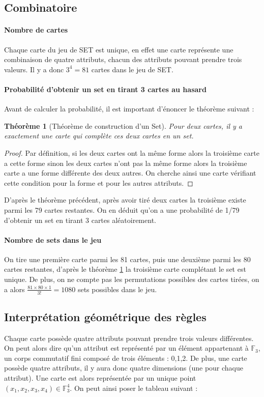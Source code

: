 \documentclass[a4paper,12pt,titlepage]{article}
\theoremstyle{plain}
\newtheorem{thm}{Théorème}
\theoremstyle{definition}
\newcommand{\Ftrois}[1]{\mathbb{F}^#1_3}
\begin{document}
\subsection{Combinatoire}

\paragraph{Nombre de cartes} Chaque carte du jeu de SET est unique, en effet une carte représente une combinaison de quatre attributs, chacun des attributs pouvant prendre trois valeurs. 
Il y a donc $3^4=81$ cartes dans le jeu de SET.

\paragraph{Probabilité d'obtenir un set en tirant 3 cartes au hasard} Avant de calculer la probabilité, il est important d'énoncer le théorème suivant :

\begin{thm}[Théorème de construction d'un Set]\label{thm:Construction}
Pour deux cartes, il y a exactement une carte qui complète ces deux cartes en un set.
\end{thm}
\begin{proof}
Par définition, si les deux cartes ont la même forme alors la troisième carte a cette forme sinon les deux cartes n'ont pas la même forme alors la troisième carte a une forme différente des deux autres. On cherche ainsi une carte vérifiant cette condition pour la forme et pour les autres attributs.
\end{proof}
D'après le théorème précédent, après avoir tiré deux cartes la troisième existe parmi les 79 cartes restantes. On en déduit qu'on a une probabilité de 1/79 d'obtenir un set en tirant 3 cartes aléatoirement.

\paragraph{Nombre de sets dans le jeu} On tire une première carte parmi les 81 cartes, puis une deuxième parmi les 80 cartes restantes, d'après le théorème \ref{thm:Construction} la troisième carte complétant le set est unique. 
De plus, on ne compte pas les permutations possibles des cartes tirées, on a alors $\frac{81 \times 80 \times 1}{3!} = 1080$ sets possibles dans le jeu.

\subsection{Interprétation géométrique des règles}
Chaque carte possède quatre attributs pouvant prendre trois valeurs différentes. On peut alors dire qu'un attribut est représenté par un élément appartenant  à $\mathbb{F}_3$, un corps commutatif fini composé de trois éléments : 0,1,2.
De plus, une carte possède quatre attributs, il y aura donc quatre dimensions (une pour chaque attribut). Une carte est alors représentée par un unique point $(x_1,x_2,x_3,x_4) \in \Ftrois{4}$.
On peut ainsi poser le tableau suivant :
\end{document}
